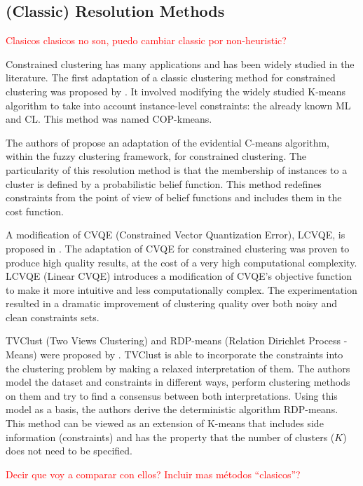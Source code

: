 \documentclass[review]{elsarticle}
\begin{document}
\subsection{(Classic) Resolution Methods} \label{sec:NHres}

\textcolor{red}{Clasicos clasicos no son, puedo cambiar classic por non-heuristic?}

Constrained clustering has many applications and has been widely studied in the literature. The first adaptation of a classic clustering method for constrained clustering was proposed by \cite{wagstaff2001constrained}. It involved modifying the widely studied K-means algorithm to take into account instance-level constraints: the already known ML and CL. This method was named COP-kmeans.

The authors of \cite{antoine2012cecm} propose an adaptation of the evidential C-means algorithm, within the fuzzy clustering framework, for constrained clustering. The particularity of this resolution method is that the membership of instances to a cluster is defined by a probabilistic belief function. This method redefines constraints from the point of view of belief functions and includes them in the cost function.

A modification of CVQE (Constrained Vector Quantization Error), LCVQE, is proposed in \cite{pelleg2007k}. The adaptation of CVQE for constrained clustering was proven to produce high quality results, at the cost of a very high computational complexity. LCVQE (Linear CVQE) introduces a modification of CVQE's objective function to make it more intuitive and less computationally complex. The experimentation resulted in a dramatic improvement of clustering quality over both noisy and clean constraints sets.

TVClust (Two Views Clustering) and RDP-means (Relation Dirichlet Process - Means) were proposed by \cite{khashabi2015clustering}. TVClust is able to incorporate the constraints into the clustering problem by making a relaxed interpretation of them. The authors model the dataset and constraints in different ways, perform clustering methods on them and try to find a consensus between both interpretations. Using this model as a basis, the authors derive the deterministic algorithm RDP-means. This method can be viewed as an extension of K-means that includes side information (constraints) and has the property that the number of clusters ($K$) does not need to be specified.

\textcolor{red}{Decir que voy a comparar con ellos? Incluir mas métodos ``clasicos''?}
\end{document}

